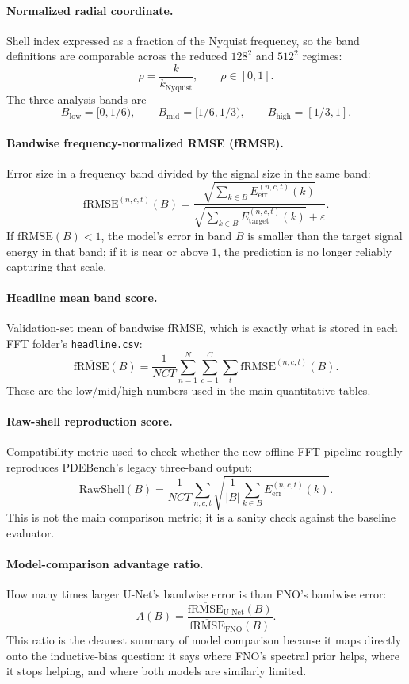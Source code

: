 \documentclass[11pt]{article}
\begin{document}
\paragraph{Normalized radial coordinate.}
Shell index expressed as a fraction of the Nyquist frequency, so the band definitions are comparable across the reduced $128^2$ and $512^2$ regimes:
\[
\rho = \frac{k}{k_{\mathrm{Nyquist}}}, \qquad \rho \in [0,1].
\]
The three analysis bands are
\[
B_{\mathrm{low}} = [0,1/6), \qquad
B_{\mathrm{mid}} = [1/6,1/3), \qquad
B_{\mathrm{high}} = [1/3,1].
\]

\paragraph{Bandwise frequency-normalized RMSE (fRMSE).}
Error size in a frequency band divided by the signal size in the same band:
\[
\mathrm{fRMSE}^{(n,c,t)}(B)
=
\frac{
\sqrt{\sum_{k \in B} E^{(n,c,t)}_{\mathrm{err}}(k)}
}{
\sqrt{\sum_{k \in B} E^{(n,c,t)}_{\mathrm{target}}(k)} + \varepsilon
}.
\]
If $\mathrm{fRMSE}(B) < 1$, the model's error in band $B$ is smaller than the target signal energy in that band; if it is near or above $1$, the prediction is no longer reliably capturing that scale.

\paragraph{Headline mean band score.}
Validation-set mean of bandwise fRMSE, which is exactly what is stored in each FFT folder's \texttt{headline.csv}:
\[
\overline{\mathrm{fRMSE}}(B)
=
\frac{1}{NCT}
\sum_{n=1}^{N}\sum_{c=1}^{C}\sum_{t}
\mathrm{fRMSE}^{(n,c,t)}(B).
\]
These are the low/mid/high numbers used in the main quantitative tables.

\paragraph{Raw-shell reproduction score.}
Compatibility metric used to check whether the new offline FFT pipeline roughly reproduces PDEBench's legacy three-band output:
\[
\overline{\mathrm{RawShell}}(B)
=
\frac{1}{NCT}
\sum_{n,c,t}
\sqrt{
\frac{1}{|B|}
\sum_{k \in B}
E^{(n,c,t)}_{\mathrm{err}}(k)
}.
\]
This is not the main comparison metric; it is a sanity check against the baseline evaluator.

\paragraph{Model-comparison advantage ratio.}
How many times larger U-Net's bandwise error is than FNO's bandwise error:
\[
A(B)
=
\frac{
\overline{\mathrm{fRMSE}}_{\mathrm{U\text{-}Net}}(B)
}{
\overline{\mathrm{fRMSE}}_{\mathrm{FNO}}(B)
}.
\]
This ratio is the cleanest summary of model comparison because it maps directly onto the inductive-bias question: it says where FNO's spectral prior helps, where it stops helping, and where both models are similarly limited.
\end{document}
